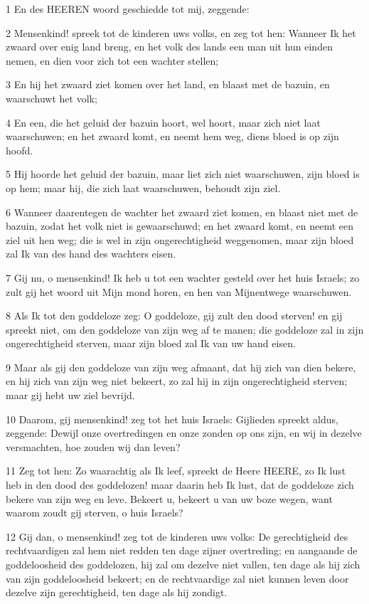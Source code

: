 \par 1 En des HEEREN woord geschiedde tot mij, zeggende:
\par 2 Mensenkind! spreek tot de kinderen uws volks, en zeg tot hen: Wanneer Ik het zwaard over enig land breng, en het volk des lands een man uit hun einden nemen, en dien voor zich tot een wachter stellen;
\par 3 En hij het zwaard ziet komen over het land, en blaast met de bazuin, en waarschuwt het volk;
\par 4 En een, die het geluid der bazuin hoort, wel hoort, maar zich niet laat waarschuwen; en het zwaard komt, en neemt hem weg, diens bloed is op zijn hoofd.
\par 5 Hij hoorde het geluid der bazuin, maar liet zich niet waarschuwen, zijn bloed is op hem; maar hij, die zich laat waarschuwen, behoudt zijn ziel.
\par 6 Wanneer daarentegen de wachter het zwaard ziet komen, en blaast niet met de bazuin, zodat het volk niet is gewaarschuwd; en het zwaard komt, en neemt een ziel uit hen weg; die is wel in zijn ongerechtigheid weggenomen, maar zijn bloed zal Ik van des hand des wachters eisen.
\par 7 Gij nu, o mensenkind! Ik heb u tot een wachter gesteld over het huis Israels; zo zult gij het woord uit Mijn mond horen, en hen van Mijnentwege waarschuwen.
\par 8 Als Ik tot den goddeloze zeg: O goddeloze, gij zult den dood sterven! en gij spreekt niet, om den goddeloze van zijn weg af te manen; die goddeloze zal in zijn ongerechtigheid sterven, maar zijn bloed zal Ik van uw hand eisen.
\par 9 Maar als gij den goddeloze van zijn weg afmaant, dat hij zich van dien bekere, en hij zich van zijn weg niet bekeert, zo zal hij in zijn ongerechtigheid sterven; maar gij hebt uw ziel bevrijd.
\par 10 Daarom, gij mensenkind! zeg tot het huis Israels: Gijlieden spreekt aldus, zeggende: Dewijl onze overtredingen en onze zonden op ons zijn, en wij in dezelve versmachten, hoe zouden wij dan leven?
\par 11 Zeg tot hen: Zo waarachtig als Ik leef, spreekt de Heere HEERE, zo Ik lust heb in den dood des goddelozen! maar daarin heb Ik lust, dat de goddeloze zich bekere van zijn weg en leve. Bekeert u, bekeert u van uw boze wegen, want waarom zoudt gij sterven, o huis Israels?
\par 12 Gij dan, o mensenkind! zeg tot de kinderen uws volks: De gerechtigheid des rechtvaardigen zal hem niet redden ten dage zijner overtreding; en aangaande de goddeloosheid des goddelozen, hij zal om dezelve niet vallen, ten dage als hij zich van zijn goddeloosheid bekeert; en de rechtvaardige zal niet kunnen leven door dezelve zijn gerechtigheid, ten dage als hij zondigt.
